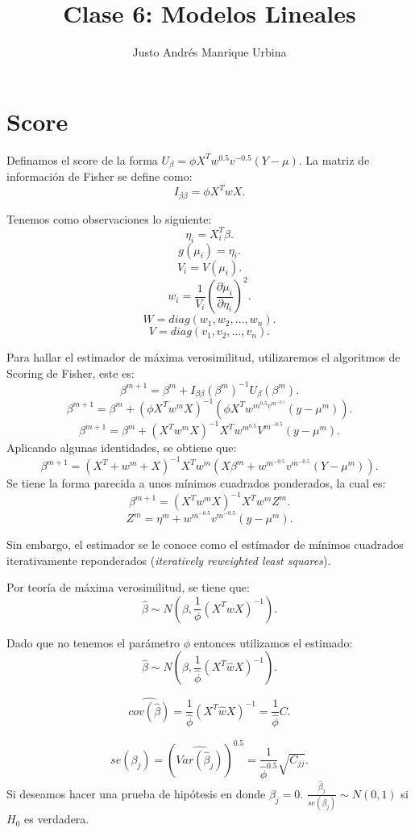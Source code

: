 \documentclass{article}
\title{Clase 6: Modelos Lineales}
\author{Justo Andrés Manrique Urbina}
\begin{document}
\maketitle
\section{Score}
Definamos el score de la forma $U_{\beta}=\phi X^{T}w^{0.5}v^{-0.5}(Y-\mu)$. La matriz de información de Fisher se define como:
\[ I_{\beta\beta}=\phi X^{T}wX.\]

Tenemos como observaciones lo siguiente:
\[ \eta_{i} = X_{i}^{T}\beta.\]
\[ g{(\mu_{i})}=\eta_{i}.\]
\[ V_{i}=V{(\mu_{i})}.\]
\[ w_{i}=\frac{1}{V_{i}}{(\frac{\partial \mu_{i}}{\partial \eta_{i}})}^{2}.\]
\[ W = diag{(w_{1},w_{2},\ldots,w_{n})}.\]
\[ V = diag{(v_{1},v_{2},\ldots,v_{n})}.\]

Para hallar el estimador de máxima verosimilitud, utilizaremos el algoritmos de Scoring de Fisher, este es:
\[ \beta^{m+1}=\beta^{m}+I_{\beta\beta}{(\beta^{m})}^{-1}U_{\beta}{(\beta^{m})}.\]
\[ \beta^{m+1}=\beta^{m}+{(\phi X^{T}w^{m}X)}^{-1}{(\phi X^{T}w^{m^{0.5}v^{m^{-0.5}}}{(y-\mu^{m})})}.\]
\[ \beta^{m+1}=\beta^{m}+{(X^{T}w^{m}X)}^{-1}X^{T}w^{m^{0.5}}V^{m^{-0.5}}{(y-\mu^{m})}.\]
Aplicando algunas identidades, se obtiene que:
\[ \beta^{m+1}={(X^{T}+w^{m}+X)}^{-1}X^{T}w^{m}{(X\beta^{m}+w^{m^{-0.5}}v^{m^{-0.5}}{(Y-\mu^{m})})}.\]
Se tiene la forma parecida a unos mínimos cuadrados ponderados, la cual es:
\[ \beta^{m+1}={(X^{T}w^{m}X)}^{-1}X^{T}w^{m}Z^{m}.\]
\[ Z^{m}=\eta^{m}+w^{m^{-0.5}}v^{m^{-0.5}}{(y-\mu^{m})}.\] 

Sin embargo, el estimador se le conoce como el estímador de mínimos cuadrados iterativamente reponderados (\textit{iteratively reweighted least squares}).

Por teoría de máxima verosimilitud, se tiene que:
\[ \hat{\beta} \sim N(\beta,\frac{1}{\phi} {(X^{T}wX)}^{-1}).\]

Dado que no tenemos el parámetro $\phi$ entonces utilizamos el estimado:
\[ \hat{\beta} \sim N{(\beta,\frac{1}{\hat{\phi}}{(X^{T}\hat{w}X)}^{-1})}.\]

\[ \hat{cov{(\hat{\beta})}}=\frac{1}{\hat{\phi}}{(X^{T}\hat{w}X)}^{-1}=\frac{1}{\hat{\phi}}C.\]

\[ se{(\beta_{j})}={(\hat{Var{(\hat{\beta}_{j})}})}^{0.5}=\frac{1}{\hat{\phi}^{0.5}}\sqrt{C_{jj}}.\]
Si deseamos hacer una prueba de hipótesis en donde $\beta_{j}=0$. $\frac{\hat{\beta}_{j}}{se(\beta_{j})} \sim N(0,1)$ si $H_{0}$ es verdadera.
\end{document}
